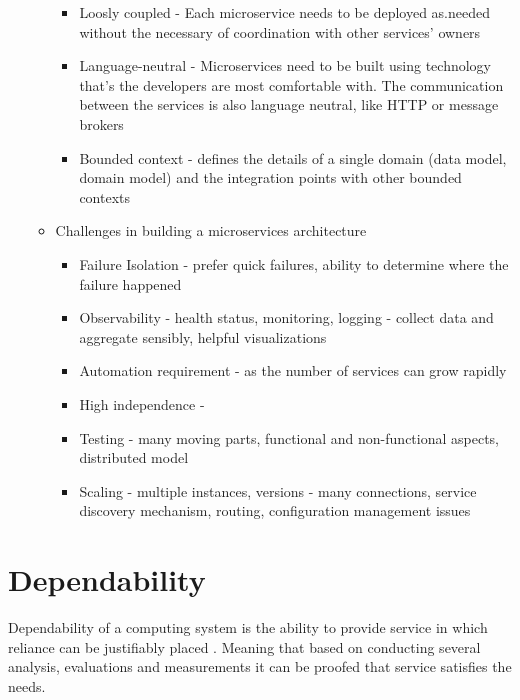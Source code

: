 \begin{itemize}
\begin{itemize}
\begin{itemize}
			\item Loosly coupled - Each microservice needs to be deployed as.needed without the necessary of coordination with other
			services’ owners
			\item Language-neutral - Microservices need to be built using technology that’s the developers are most comfortable with. The communication between the services is also language neutral, like HTTP or message brokers
			\item Bounded context - defines the details of a single domain (data model, domain model) and the integration points with other bounded contexts
		\end{itemize}
		\item Challenges in building a microservices architecture
		\begin{itemize}
			\item Failure Isolation - prefer quick failures, ability to determine where the failure happened
			\item Observability - health status, monitoring, logging - collect data and aggregate sensibly, helpful visualizations
			\item Automation requirement - as the number of services can grow rapidly
			\item High independence - 
			\item Testing - many moving parts, functional and non-functional aspects, distributed model
			\item Scaling - multiple instances, versions - many connections, service discovery mechanism, routing, configuration management issues
		\end{itemize}
	\end{itemize}
\end{itemize}


\section{Dependability}

Dependability of a computing system is the ability to provide service in which reliance can be justifiably placed \cite{DependabilityBMEMIT}. Meaning that based on conducting several analysis, evaluations and measurements it can be proofed that service satisfies the needs.

